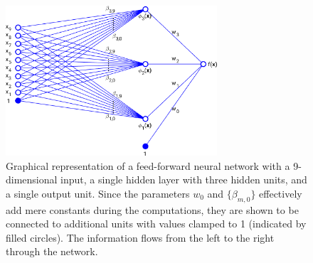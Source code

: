\documentclass[10pt,twoside]{book}
\begin{document}
\begin{figure}
  \centering
  \includegraphics[width=0.7\textwidth]{NNpicture}
  \caption{Graphical representation of a feed-forward neural network with a 9-dimensional input, a single hidden layer with three hidden units, and a single output unit. 
  Since the parameters $w_0$ and $\{ \beta_{m,0} \}$ effectively add mere constants during the computations, 
  they are shown to be connected to additional units with values clamped to 1 (indicated by filled circles).
  The information flows from the left to the right through the network.
  }
  \label{fig:CNN}
\end{figure}
\end{document}
